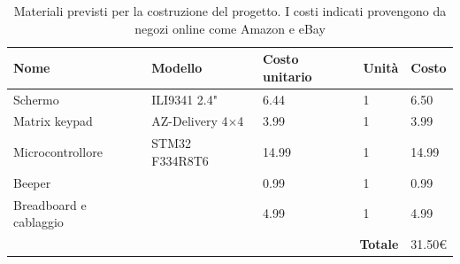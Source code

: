 \documentclass[a4paper]{article}
\begin{document}
\begin{center}
	\begin{table}[ht]
		\centering
		\begin{tabular}{|llll|l|}
			\hline
			\multicolumn{1}{|l|}{\textbf{Nome}}                   & \multicolumn{1}{l|}{\textbf{Modello}}       & \multicolumn{1}{l|}{\textbf{Costo unitario}} & \textbf{Unità} & \textbf{Costo} \\ \hline
			\multicolumn{1}{|l|}{Schermo}                & \multicolumn{1}{l|}{ILI9341 2.4"}           & \multicolumn{1}{l|}{6.44}                    & 1               & 6.50           \\ \hline
			\multicolumn{1}{|l|}{Matrix keypad}          & \multicolumn{1}{l|}{AZ-Delivery 4$\times$4}        & \multicolumn{1}{l|}{3.99}                    & 1               & 3.99           \\ \hline
			\multicolumn{1}{|l|}{Microcontrollore}       & \multicolumn{1}{l|}{STM32 F334R8T6}         & \multicolumn{1}{l|}{14.99}                   & 1               & 14.99          \\ \hline
			\multicolumn{1}{|l|}{Beeper}                 & \multicolumn{1}{l|}{}                       & \multicolumn{1}{l|}{0.99}                    & 1               & 0.99           \\ \hline
			\multicolumn{1}{|l|}{Breadboard e cablaggio} & \multicolumn{1}{l|}{}                       & \multicolumn{1}{l|}{4.99}                    & 1               & 4.99           \\ \hline
			\multicolumn{4}{|r|}{\textbf{Totale}}                                                                                                            & 31.50\euro        \\ \hline
		\end{tabular}
		\caption{
			Materiali previsti per la costruzione del progetto. I costi indicati
			provengono da negozi online come Amazon e eBay
		}
	\end{table}
\end{center}
\end{document}
